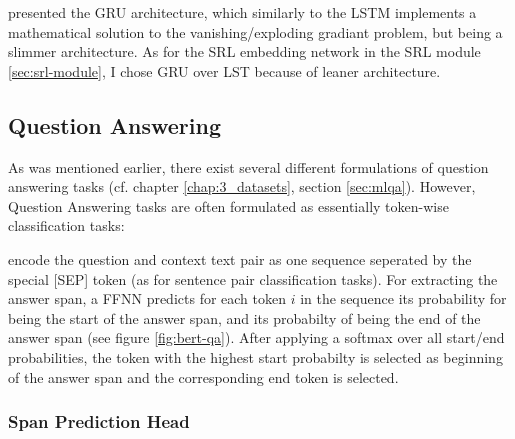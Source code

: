 \citep{cho2014learning} presented the GRU architecture, which similarly to the LSTM
implements a mathematical solution to the vanishing/exploding gradiant problem, but
being a slimmer architecture. As for the SRL embedding network in the SRL module
\ref{sec:srl-module}, I chose GRU over LST because of leaner architecture.




\subsection{Question Answering}
\label{sec:question-answering}


As was mentioned earlier, there exist several different formulations of question answering tasks
(cf. chapter \ref{chap:3_datasets}, section \ref{sec:mlqa}). However, Question Answering tasks are
often formulated as essentially token-wise classification tasks:

\citeauthor{devlin2018bert} encode the question and context text pair as one sequence
seperated by the special [SEP] token (as for sentence pair classification tasks). For
extracting the answer span, a FFNN predicts for each token $i$ in the sequence its
probability for being the start of the answer span, and its probabilty of being the
end of the answer span (see figure \ref{fig:bert-qa}). After applying a softmax over
all start/end probabilities, the token with the highest start probabilty is selected
as beginning of the answer span and the corresponding end token is selected.





\subsubsection{Span Prediction Head}

